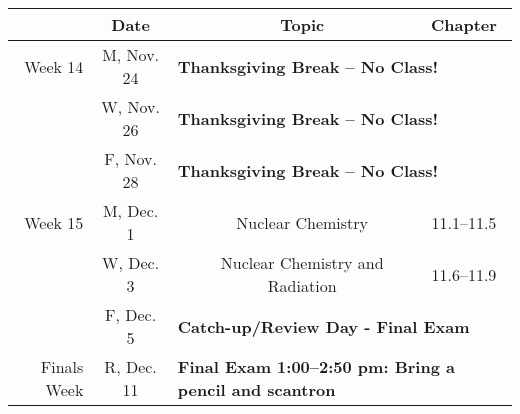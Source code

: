 \documentclass[12pt, letterpaper]{article}
\begin{document}
\begin{tabular}{rcccc}
& Date && Topic & Chapter\\
\midrule
Week 14 & M, Nov. 24& \multicolumn{3}{l}{\textbf{Thanksgiving Break -- No Class!}}\\
& W, Nov. 26& \multicolumn{3}{l}{\textbf{Thanksgiving Break -- No Class!}}\\
& F, Nov. 28& \multicolumn{3}{l}{\textbf{Thanksgiving Break -- No Class!}}\\
\midrule
Week 15 & M, Dec. 1&& Nuclear Chemistry & 11.1--11.5\\
& W, Dec. 3&& Nuclear Chemistry and Radiation & 11.6--11.9\\
& F, Dec. 5& \multicolumn{3}{l}{\textbf{Catch-up/Review Day - Final Exam}}\\
\midrule
Finals Week& R, Dec. 11& \multicolumn{3}{l}{\textbf{Final Exam 1:00--2:50 pm: Bring a pencil and scantron}}\\
\end{tabular}
\end{document}
